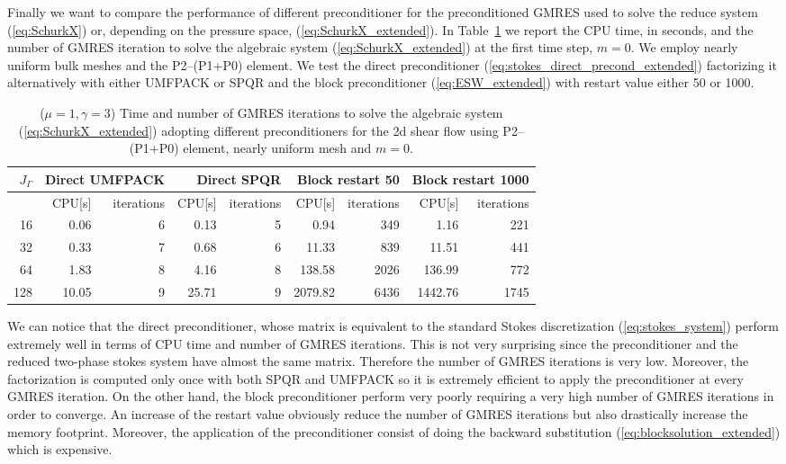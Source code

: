 Finally we want to compare the performance of different preconditioner
for the preconditioned GMRES used to solve the reduce system
(\ref{eq:SchurkX}) or, depending on the pressure space,
(\ref{eq:SchurkX_extended}). In Table~\ref{tab:shear_2d_preconditioners} we
report the CPU time, in seconds, and the number of GMRES iteration to solve the
algebraic system (\ref{eq:SchurkX_extended}) at the first time step, $m=0$. We
employ nearly uniform bulk meshes and the P2--(P1+P0) element. We test the
direct preconditioner (\ref{eq:stokes_direct_precond_extended}) factorizing it
alternatively with either UMFPACK or SPQR and the block preconditioner
(\ref{eq:ESW_extended}) with restart value either 50 or 1000.
\begin{table}
\center
\hspace*{-3.25cm}
\begin{tabular}{rrrrrrrrr}
\hline
$J_\Gamma$ & \multicolumn{2}{r}{Direct UMFPACK} &
\multicolumn{2}{r}{Direct SPQR} & \multicolumn{2}{r}{Block restart 50} &
\multicolumn{2}{r}{Block restart 1000} \\
\hline
 & CPU[s] & iterations & CPU[s] & iterations & CPU[s] & iterations & CPU[s] &
iterations \\
\hline
 16 &  0.06 & 6 &  0.13 & 5 &    0.94 &  349 &    1.16 &  221 \\
 32 &  0.33 & 7 &  0.68 & 6 &   11.33 &  839 &   11.51 &  441 \\
 64 &  1.83 & 8 &  4.16 & 8 &  138.58 & 2026 &  136.99 &  772 \\
128 & 10.05 & 9 & 25.71 & 9 & 2079.82 & 6436 & 1442.76 & 1745 \\
\hline
\end{tabular}
\hspace*{-3.25cm}
\caption[Stokes 2d shear flow preconditioners comparison]
{($\mu=1,\gamma=3$) Time and number of GMRES iterations to solve the algebraic
system (\ref{eq:SchurkX_extended}) adopting different preconditioners for the 2d
shear flow using P2--(P1+P0) element, nearly uniform mesh and $m=0$.}
\label{tab:shear_2d_preconditioners}
\end{table}
We can notice that the direct preconditioner, whose matrix is equivalent to
the standard Stokes discretization (\ref{eq:stokes_system}) perform extremely
well in terms of CPU time and number of GMRES iterations. This is not very
surprising since the preconditioner and the reduced two-phase stokes system
have almost the same matrix. Therefore the number of GMRES iterations is very
low. Moreover, the factorization is computed only once with both SPQR and
UMFPACK so it is extremely efficient to apply the preconditioner at every GMRES
iteration. On the other hand, the block preconditioner perform very poorly
requiring a very high number of GMRES iterations in order to converge. An
increase of the restart value obviously reduce the number of GMRES iterations
but also drastically increase the memory footprint. Moreover, the application
of the preconditioner consist of doing the backward substitution
(\ref{eq:blocksolution_extended}) which is expensive.


